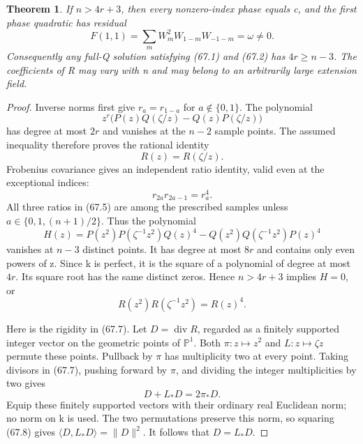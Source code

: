 \documentclass[11pt,reqno]{amsart}
\theoremstyle{plain}
\newtheorem{theorem}{Theorem}[section]
\begin{document}
\begin{theorem}
If \(n>4r+3\), then every nonzero-index phase equals c,
and the first phase quadratic has residual
\begin{equation*}
 F(1,1)=\sum_m W_m^2W_{1-m}W_{-1-m}=\omega\ne0.
 \tag{67.3}
\end{equation*}
Consequently any full-Q solution satisfying (67.1) and (67.2) has
\(4r\ge n-3\). The coefficients of R may vary with n and may
belong to an arbitrarily large extension field.
\end{theorem}

\begin{proof}
Inverse norms first give
\(r_a=r_{1-a}\) for \(a\notin\{0,1\}\). The polynomial
\[
 z^r\bigl(P(z)Q(\zeta/z)-Q(z)P(\zeta/z)\bigr)
\]
has degree at most \(2r\) and vanishes at the \(n-2\) sample
points. The assumed inequality therefore proves the rational identity
\begin{equation*}
 R(z)=R(\zeta/z).
 \tag{67.4}
\end{equation*}
Frobenius covariance gives an independent ratio identity, valid even
at the exceptional indices:
\begin{equation*}
 r_{2a}r_{2a-1}=r_a^4.
 \tag{67.5}
\end{equation*}
All three ratios in (67.5) are among the prescribed samples unless
\(a\in\{0,1,(n+1)/2\}\). Thus the polynomial
\begin{equation*}
 H(z)=P(z^2)P(\zeta^{-1}z^2)Q(z)^4
       -Q(z^2)Q(\zeta^{-1}z^2)P(z)^4
 \tag{67.6}
\end{equation*}
vanishes at \(n-3\) distinct points. It has degree at most \(8r\)
and contains only even powers of z. Since k is perfect, it is the
square of a polynomial of degree at most \(4r\). Its square root
has the same distinct zeros. Hence \(n>4r+3\) implies \(H=0\), or
\begin{equation*}
 R(z^2)R(\zeta^{-1}z^2)=R(z)^4.
 \tag{67.7}
\end{equation*}

Here is the rigidity in (67.7). Let \(D=\operatorname{div}R\),
regarded as a finitely supported integer vector on the geometric
points of \(\mathbb P^1\). Both \(\pi:z\mapsto z^2\) and
\(L:z\mapsto\zeta z\) permute these points. Pullback by \(\pi\)
has multiplicity two at every point. Taking divisors in (67.7),
pushing forward by \(\pi\), and dividing the integer multiplicities
by two gives
\begin{equation*}
 D+L_*D=2\pi_*D.
 \tag{67.8}
\end{equation*}
Equip these finitely supported vectors with their ordinary real
Euclidean norm; no norm on k is used. The two permutations preserve
this norm, so squaring (67.8) gives
\(\langle D,L_*D\rangle=\lVert D\rVert^2\). It follows that
\(D=L_*D\).


\end{proof}
\end{document}
